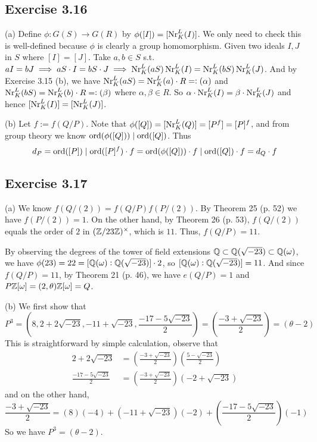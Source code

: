 \documentclass[../Marcus.tex]{subfiles}
\begin{document}
\subsection*{Exercise 3.16}

(a) Define $\phi:G(S)\to G(R)$ by $\phi([I])=[\operatorname{Nr}^L_K(I)]$. We only need to check this is well-defined because $\phi$ is clearly a group homomorphism. Given two ideals $I,J$ in $S$ where $[I]=[J]$. Take $a,b\in S$ s.t. $aI=bJ\implies aS\cdot I=bS\cdot J\implies \operatorname{Nr}^L_K(aS)\operatorname{Nr}^L_K(I)=\operatorname{Nr}^L_K(bS)\operatorname{Nr}^L_K(J)$. And by Exercise 3.15 (b), we have $\operatorname{Nr}^L_K(aS)=\operatorname{Nr}^L_K(a)\cdot R=:(\alpha)$ and $\operatorname{Nr}^L_K(bS)=\operatorname{Nr}^L_K(b)\cdot R=:(\beta)$ where $\alpha,\beta\in R$. So $\alpha\cdot\operatorname{Nr}^L_K(I)=\beta\cdot\operatorname{Nr}^L_K(J)$ and hence $[\operatorname{Nr}^L_K(I)]=[\operatorname{Nr}^L_K(J)]$.

(b) Let $f:=f(Q/P)$. Note that $\phi([Q])=[\operatorname{Nr}^L_K(Q)]=[P^f]=[P]^f$, and from group theory we know $\operatorname{ord}(\phi([Q]))\mid \operatorname{ord}([Q])$. Thus
$$
d_P=\operatorname{ord}([P])\mid \operatorname{ord}([P]^f)\cdot f = \operatorname{ord}(\phi([Q]))\cdot f\mid \operatorname{ord}([Q])\cdot f=d_Q\cdot f
$$

\subsection*{Exercise 3.17}

(a) We know $f(Q/(2))=f(Q/P)f(P/(2))$. By Theorem 25 (p. 52) we have $f(P/(2))=1$. On the other hand, by Theorem 26 (p. 53), $f(Q/(2))$ equals the order of $2$ in $(\mathbb{Z}/23\mathbb{Z})^{\times}$, which is $11$. Thus, $f(Q/P)=11$.

By observing the degrees of the tower of field extensions $\mathbb{Q}\subset \mathbb{Q}(\sqrt{-23})\subset \mathbb{Q}(\omega)$, we have $\phi(23)=22=[\mathbb{Q}(\omega):\mathbb{Q}(\sqrt{-23})]\cdot 2$, so $[\mathbb{Q}(\omega):\mathbb{Q}(\sqrt{-23})]=11$. And since $f(Q/P)=11$, by Theorem 21 (p. 46), we have $e(Q/P)=1$ and $P\mathbb{Z}[\omega]=(2,\theta)\mathbb{Z}[\omega]=Q$.

(b) We first show that $$P^3=\left(8,2+2\sqrt{-23},-11+\sqrt{-23},\frac{-17-5\sqrt{-23}}{2}\right)=\left(\frac{-3+\sqrt{-23}}{2}\right)=(\theta-2)$$ This is straightforward by simple calculation, observe that
\begin{align*}
    2+2\sqrt{-23} &= \left(\frac{-3+\sqrt{-23}}{2}\right)\left(\frac{5-\sqrt{-23}}{2}\right) \\
    \frac{-17-5\sqrt{-23}}{2} &= \left(\frac{-3+\sqrt{-23}}{2}\right)(-2+\sqrt{-23})
\end{align*}
and on the other hand, $$\frac{-3+\sqrt{-23}}{2}=(8)(-4)+(-11+\sqrt{-23})(-2)+\left(\frac{-17-5\sqrt{-23}}{2}\right)(-1)$$ So we have $P^3=(\theta-2)$.
\end{document}

